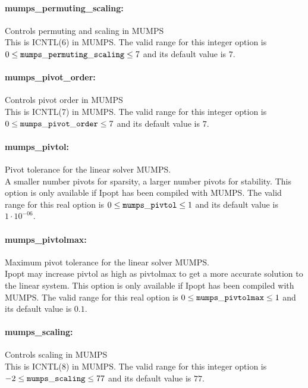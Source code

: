 \paragraph{mumps\_permuting\_scaling:}\label{sec:mumps_permuting_scaling} Controls permuting and scaling in MUMPS $\;$ \\
 This is ICNTL(6) in MUMPS. The valid range for this integer option is
$0 \le {\tt mumps\_permuting\_scaling } \le 7$
and its default value is $7$.


\paragraph{mumps\_pivot\_order:}\label{sec:mumps_pivot_order} Controls pivot order in MUMPS $\;$ \\
 This is ICNTL(7) in MUMPS. The valid range for this integer option is
$0 \le {\tt mumps\_pivot\_order } \le 7$
and its default value is $7$.


\paragraph{mumps\_pivtol:}\label{sec:mumps_pivtol} Pivot tolerance for the linear solver MUMPS. $\;$ \\
 A smaller number pivots for sparsity, a larger
number pivots for stability.  This option is only
available if Ipopt has been compiled with MUMPS. The valid range for this real option is 
$0 \le {\tt mumps\_pivtol } \le 1$
and its default value is $1 \cdot 10^{-06}$.


\paragraph{mumps\_pivtolmax:}\label{sec:mumps_pivtolmax} Maximum pivot tolerance for the linear solver MUMPS. $\;$ \\
 Ipopt may increase pivtol as high as pivtolmax to
get a more accurate solution to the linear
system.  This option is only available if Ipopt
has been compiled with MUMPS. The valid range for this real option is 
$0 \le {\tt mumps\_pivtolmax } \le 1$
and its default value is $0.1$.


\paragraph{mumps\_scaling:}\label{sec:mumps_scaling} Controls scaling in MUMPS $\;$ \\
 This is ICNTL(8) in MUMPS. The valid range for this integer option is
$-2 \le {\tt mumps\_scaling } \le 77$
and its default value is $77$.


